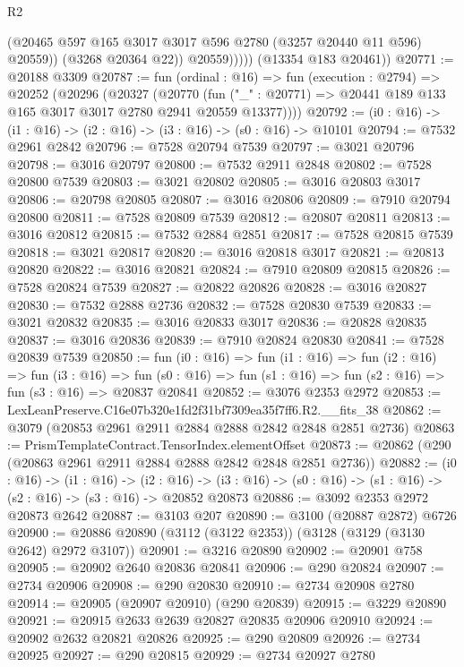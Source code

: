 \begin{lexlean}{R2}
\begin{coremodule}
                    (@20465 @597 @165 @3017 @3017 @596 @2780 (@3257 @20440 @11 @596) @20559))
                  (@3268 @20364 @22))
                @20559)))))
      (@13354 @183 @20461))
@20771 := @20188 @3309
@20787 := fun (ordinal : @16) =>
  fun (execution : @2794) =>
  @20252
    (@20296
      (@20327
        (@20770
          (fun ("_" : @20771) => @20441 @189 @133 @165 @3017 @3017 @2780 @2941 @20559 @13377))))
@20792 := (i0 : @16) -> (i1 : @16) -> (i2 : @16) -> (i3 : @16) -> (s0 : @16) -> @10101
@20794 := @7532 @2961 @2842
@20796 := @7528 @20794 @7539
@20797 := @3021 @20796
@20798 := @3016 @20797
@20800 := @7532 @2911 @2848
@20802 := @7528 @20800 @7539
@20803 := @3021 @20802
@20805 := @3016 @20803 @3017
@20806 := @20798 @20805
@20807 := @3016 @20806
@20809 := @7910 @20794 @20800
@20811 := @7528 @20809 @7539
@20812 := @20807 @20811
@20813 := @3016 @20812
@20815 := @7532 @2884 @2851
@20817 := @7528 @20815 @7539
@20818 := @3021 @20817
@20820 := @3016 @20818 @3017
@20821 := @20813 @20820
@20822 := @3016 @20821
@20824 := @7910 @20809 @20815
@20826 := @7528 @20824 @7539
@20827 := @20822 @20826
@20828 := @3016 @20827
@20830 := @7532 @2888 @2736
@20832 := @7528 @20830 @7539
@20833 := @3021 @20832
@20835 := @3016 @20833 @3017
@20836 := @20828 @20835
@20837 := @3016 @20836
@20839 := @7910 @20824 @20830
@20841 := @7528 @20839 @7539
@20850 := fun (i0 : @16) =>
  fun (i1 : @16) =>
  fun (i2 : @16) =>
  fun (i3 : @16) =>
  fun (s0 : @16) => fun (s1 : @16) => fun (s2 : @16) => fun (s3 : @16) => @20837 @20841
@20852 := @3076 @2353 @2972
@20853 := LexLeanPreserve.C16e07b320e1fd2f31bf7309ea35f7ff6.R2.__fits_38
@20862 := @3079 (@20853 @2961 @2911 @2884 @2888 @2842 @2848 @2851 @2736)
@20863 := PrismTemplateContract.TensorIndex.elementOffset
@20873 := @20862 (@290 (@20863 @2961 @2911 @2884 @2888 @2842 @2848 @2851 @2736))
@20882 := (i0 : @16) ->
  (i1 : @16) ->
  (i2 : @16) -> (i3 : @16) -> (s0 : @16) -> (s1 : @16) -> (s2 : @16) -> (s3 : @16) -> @20852 @20873
@20886 := @3092 @2353 @2972 @20873 @2642
@20887 := @3103 @207
@20890 := @3100 (@20887 @2872) @6726
@20900 := @20886 @20890 (@3112 (@3122 @2353)) (@3128 (@3129 (@3130 @2642) @2972 @3107))
@20901 := @3216 @20890
@20902 := @20901 @758
@20905 := @20902 @2640 @20836 @20841
@20906 := @290 @20824
@20907 := @2734 @20906
@20908 := @290 @20830
@20910 := @2734 @20908 @2780
@20914 := @20905 (@20907 @20910) (@290 @20839)
@20915 := @3229 @20890
@20921 := @20915 @2633 @2639 @20827 @20835 @20906 @20910
@20924 := @20902 @2632 @20821 @20826
@20925 := @290 @20809
@20926 := @2734 @20925
@20927 := @290 @20815
@20929 := @2734 @20927 @2780

\end{coremodule}
\end{lexlean}
